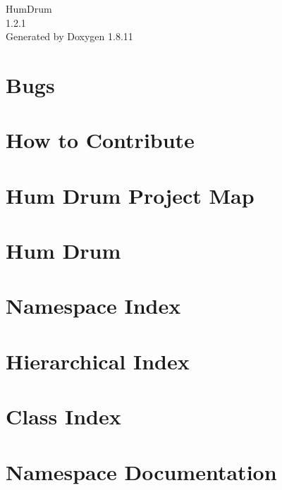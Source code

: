 \documentclass[twoside]{book}
\newcommand{\+}{\discretionary{\mbox{\scriptsize$\hookleftarrow$}}{}{}}
\newcommand{\clearemptydoublepage}{%
  \newpage{\pagestyle{empty}\cleardoublepage}%
}
\begin{document}
\hypersetup{pageanchor=false,
             bookmarksnumbered=true,
             pdfencoding=unicode
            }
\begin{titlepage}
\vspace*{7cm}
\begin{center}%
{\Large Hum\+Drum \\[1ex]\large 1.\+2.\+1 }\\
\vspace*{1cm}
{\large Generated by Doxygen 1.8.11}\\
\end{center}
\end{titlepage}
\clearemptydoublepage
\tableofcontents
\clearemptydoublepage
{}
\hypersetup{pageanchor=true}

\chapter{Bugs}
\label{md_BUGS}
\hypertarget{md_BUGS}{}

\chapter{How to Contribute}
\label{md_CONTRIBUTING}
\hypertarget{md_CONTRIBUTING}{}

\chapter{Hum Drum Project Map}
\label{md_MAP}
\hypertarget{md_MAP}{}

\chapter{Hum Drum}
\label{md_README}
\hypertarget{md_README}{}

\chapter{Namespace Index}

\chapter{Hierarchical Index}

\chapter{Class Index}

\chapter{Namespace Documentation}














\end{document}
